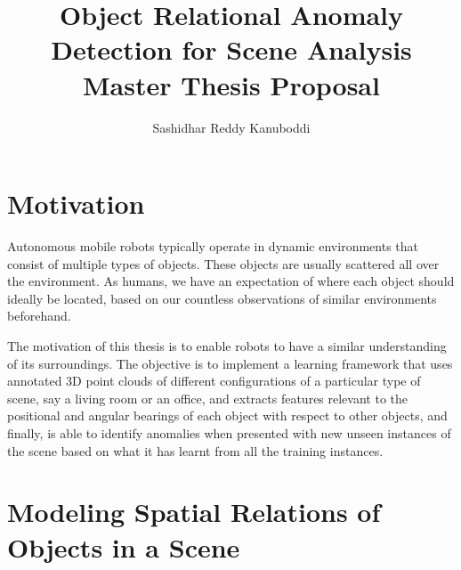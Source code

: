 \documentclass[12pt]{article}
\begin{document}

\title{\textbf{Object Relational Anomaly Detection for Scene Analysis}\bigbreak
Master Thesis Proposal}
\author{Sashidhar Reddy Kanuboddi}

\maketitle


\newpage

\tableofcontents{}


\newpage

\section{Motivation}

Autonomous mobile robots typically operate in dynamic environments that consist of multiple types of objects. These objects are usually scattered all over the environment. As humans, we have an expectation of where each object should ideally be located, based on our countless observations of similar environments beforehand.

The motivation of this thesis is to enable robots to have a similar understanding of its surroundings. The objective is to implement a learning framework that uses annotated 3D point clouds of different configurations of a particular type of scene, say a living room or an office, and extracts features relevant to the positional and angular bearings of each object with respect to other objects, and finally, is able to identify anomalies when presented with new unseen instances of the scene based on what it has learnt from all the training instances.



\section{Modeling Spatial Relations of Objects in a Scene}
\end{document}
